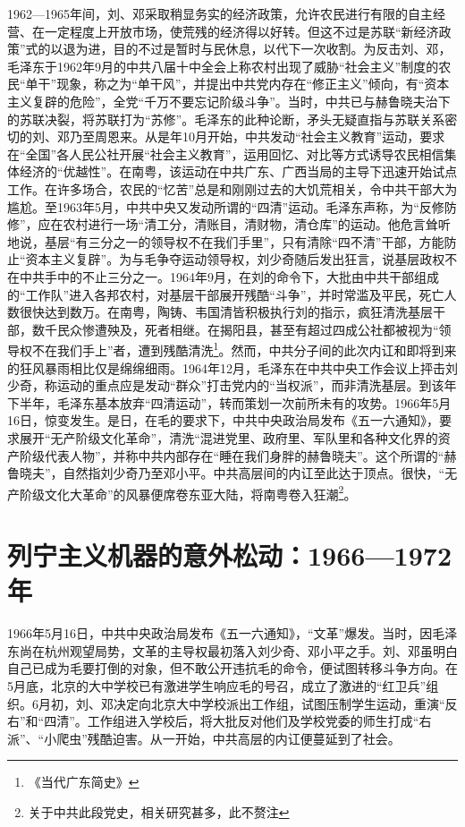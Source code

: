 1962—1965年间，刘、邓采取稍显务实的经济政策，允许农民进行有限的自主经营、在一定程度上开放市场，使荒残的经济得以好转。但这不过是苏联“新经济政策”式的以退为进，目的不过是暂时与民休息，以代下一次收割。为反击刘、邓，毛泽东于1962年9月的中共八届十中全会上称农村出现了威胁“社会主义”制度的农民“单干”现象，称之为“单干风”，并提出中共党内存在“修正主义”倾向，有“资本主义复辟的危险”，全党“千万不要忘记阶级斗争”。当时，中共已与赫鲁晓夫治下的苏联决裂，将苏联打为“苏修”。毛泽东的此种论断，矛头无疑直指与苏联关系密切的刘、邓乃至周恩来。从是年10月开始，中共发动“社会主义教育”运动，要求在“全国”各人民公社开展“社会主义教育”，运用回忆、对比等方式诱导农民相信集体经济的“优越性”。在南粤，该运动在中共广东、广西当局的主导下迅速开始试点工作。在许多场合，农民的“忆苦”总是和刚刚过去的大饥荒相关，令中共干部大为尴尬。至1963年5月，中共中央又发动所谓的“四清”运动。毛泽东声称，为“反修防修”，应在农村进行一场“清工分，清账目，清财物，清仓库”的运动。他危言耸听地说，基层“有三分之一的领导权不在我们手里”，只有清除“四不清”干部，方能防止“资本主义复辟”。为与毛争夺运动领导权，刘少奇随后发出狂言，说基层政权不在中共手中的不止三分之一。1964年9月，在刘的命令下，大批由中共干部组成的“工作队”进入各邦农村，对基层干部展开残酷“斗争”，并时常滥及平民，死亡人数很快达到数万。在南粤，陶铸、韦国清皆积极执行刘的指示，疯狂清洗基层干部，数千民众惨遭殃及，死者相继。在揭阳县，甚至有超过四成公社都被视为“领导权不在我们手上”者，遭到残酷清洗\footnote{《当代广东简史》}。然而，中共分子间的此次内讧和即将到来的狂风暴雨相比仅是绵绵细雨。1964年12月，毛泽东在中共中央工作会议上抨击刘少奇，称运动的重点应是发动“群众”打击党内的“当权派”，而非清洗基层。到该年下半年，毛泽东基本放弃“四清运动”，转而策划一次前所未有的攻势。1966年5月16日，惊变发生。是日，在毛的要求下，中共中央政治局发布《五一六通知》，要求展开“无产阶级文化革命”，清洗“混进党里、政府里、军队里和各种文化界的资产阶级代表人物”，并称中共内部存在“睡在我们身胖的赫鲁晓夫”。这个所谓的“赫鲁晓夫”，自然指刘少奇乃至邓小平。中共高层间的内讧至此达于顶点。很快，“无产阶级文化大革命”的风暴便席卷东亚大陆，将南粤卷入狂潮\footnote{关于中共此段党史，相关研究甚多，此不赘注}。

\section{列宁主义机器的意外松动：1966—1972年}

1966年5月16日，中共中央政治局发布《五一六通知》，“文革”爆发。当时，因毛泽东尚在杭州观望局势，文革的主导权最初落入刘少奇、邓小平之手。刘、邓虽明白自己已成为毛要打倒的对象，但不敢公开违抗毛的命令，便试图转移斗争方向。在5月底，北京的大中学校已有激进学生响应毛的号召，成立了激进的“红卫兵”组织。6月初，刘、邓决定向北京大中学校派出工作组，试图压制学生运动，重演“反右”和“四清”。工作组进入学校后，将大批反对他们及学校党委的师生打成“右派”、“小爬虫”残酷迫害。从一开始，中共高层的内讧便蔓延到了社会。


